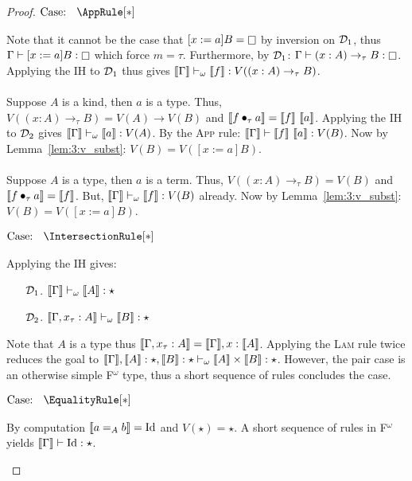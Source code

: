 \begin{proof}
    $\text{Case: }\begin{array}{c} \AppRule[*] \end{array}$
    \begin{proofcase}
        Note that it cannot be the case that $[x := a]B = \kind$ by inversion on $\mathcal{D}_{1}$, thus $\Gamma \vdash [x := a]B : \kind$ which force $m = \tau$.
        Furthermore, by $\mathcal{D}_{1}$: $\Gamma \vdash (x : A) \to_\tau B : \kind$.
        Applying the IH to $\mathcal{D}_{1}$ thus gives $\llbracket \Gamma \rrbracket \vdash_\omega \llbracket f \rrbracket : V((x : A) \to_\tau B)$.
        \\ \\
        Suppose $A$ is a kind, then $a$ is a type.
        Thus, $V((x : A) \to_\tau B) = V(A) \to V(B)$ and $\sema{\app{f}{\tau}{a}} = \sema{f}\ \sema{a}$.
        Applying the IH to $\mathcal{D}_{2}$ gives $\llbracket \Gamma \rrbracket \vdash_\omega \llbracket a \rrbracket : V(A)$.
        By the \textsc{App} rule: $\llbracket \Gamma \rrbracket \vdash \llbracket f \rrbracket\ \llbracket a \rrbracket : V(B)$.
        Now by Lemma~\ref{lem:3:v_subst}: $V(B) = V([x := a]B)$.
        \\ \\
        Suppose $A$ is a type, then $a$ is a term.
        Thus, $V((x : A) \to_\tau B) = V(B)$ and $\llbracket f \bullet_{\tau} a \rrbracket = \llbracket f \rrbracket$.
        But, $\llbracket \Gamma \rrbracket \vdash_\omega \llbracket f \rrbracket : V(B)$ already.
        Now by Lemma~\ref{lem:3:v_subst}: $V(B) = V([x := a]B)$.
    \end{proofcase}

    $\text{Case: }\begin{array}{c} \IntersectionRule[*] \end{array}$
    \begin{proofcase}
        Applying the IH gives:
        \begin{enumerate}
            \item[$\mathcal{D}_{1}$.] $\llbracket \Gamma \rrbracket \vdash_\omega \llbracket A \rrbracket : \star$
            \item[$\mathcal{D}_{2}$.] $\llbracket \Gamma, x_\tau : A \rrbracket \vdash_\omega \llbracket B \rrbracket : \star$ 
        \end{enumerate}
        Note that $A$ is a type thus $\llbracket \Gamma, x_\tau : A \rrbracket = \llbracket \Gamma \rrbracket, x : \llbracket A \rrbracket$.
        Applying the \textsc{Lam} rule twice reduces the goal to $\llbracket \Gamma \rrbracket, \llbracket A \rrbracket : \star, \llbracket B \rrbracket : \star \vdash_\omega \llbracket A \rrbracket \times \llbracket B \rrbracket : \star$.
        However, the pair case is an otherwise simple F$^\omega$ type, thus a short sequence of rules concludes the case.
    \end{proofcase}

    $\text{Case: }\begin{array}{c} \EqualityRule[*] \end{array}$
    \begin{proofcase}
        By computation $\llbracket a =_A b \rrbracket = \textnormal{Id}$ and $V(\star) = \star$.
        A short sequence of rules in F$^\omega$ yields $\llbracket \Gamma \rrbracket \vdash \textnormal{Id} : \star$.
    \end{proofcase}


\end{proof}
